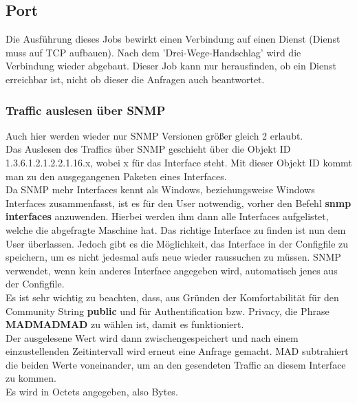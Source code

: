 \documentclass[12pt,a4paper]{report}
\begin{document}
\subsection{Port} Die Ausführung dieses Jobs bewirkt einen Verbindung auf einen Dienst (Dienst muss auf TCP aufbauen). Nach dem 'Drei-Wege-Handschlag' wird die Verbindung wieder abgebaut. Dieser Job kann nur herausfinden, ob ein Dienst erreichbar ist, nicht ob dieser die Anfragen auch beantwortet.

\newpage
{}%

\subsubsection{Traffic auslesen über SNMP}
Auch hier werden wieder nur SNMP Versionen größer gleich 2 erlaubt.\\
Das Auslesen des Traffics über SNMP geschieht über die Objekt ID 1.3.6.1.2.1.2.2.1.16.x, wobei x für das Interface steht. Mit dieser Objekt ID kommt man zu den ausgegangenen Paketen eines Interfaces.\\
Da SNMP mehr Interfaces kennt als Windows, beziehungsweise Windows Interfaces zusammenfasst, ist es für den User notwendig, vorher den Befehl \textbf{snmp interfaces} anzuwenden. Hierbei werden ihm dann alle Interfaces aufgelistet, welche die abgefragte Maschine hat. Das richtige Interface zu finden ist nun dem User überlassen. Jedoch gibt es die Möglichkeit, das Interface in der Configfile zu speichern, um es nicht jedesmal aufs neue wieder raussuchen zu müssen. SNMP verwendet, wenn kein anderes Interface angegeben wird, automatisch jenes aus der Configfile.\\
Es ist sehr wichtig zu beachten, dass, aus Gründen der Komfortabilität für den Community String \textbf{public} und für Authentification bzw. Privacy, die Phrase \textbf{MADMADMAD} zu wählen ist, damit es funktioniert.\\

Der ausgelesene Wert wird dann zwischengespeichert und nach einem einzustellenden Zeitintervall wird erneut eine Anfrage gemacht. MAD subtrahiert die beiden Werte voneinander, um an den gesendeten Traffic an diesem Interface zu kommen.\\
Es wird in Octets angegeben, also Bytes.
\end{document}

